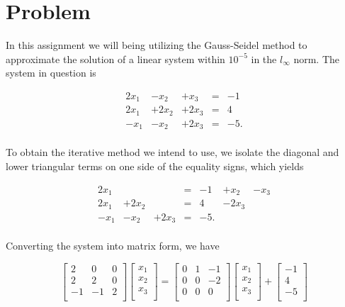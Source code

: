 \documentclass[a4paper, 12pt, twoside]{article}
\begin{document}
\section{Problem}
In this assignment we will being utilizing the Gauss-Seidel method to approximate the solution of a linear system within $10^{-5}$
in the $l_\infty$ norm. The system in question is 

\begin{equation}
\label{one}
\begin{array}{rrrrr}
2x_1& -x_2& + x_3& = & -1\\
2x_1& +2x_2& + 2x_3& = & 4\\
-x_1& -x_2& + 2x_3& = & -5.\\ 
\end{array}
\end{equation}

To obtain the iterative method we intend to use, we isolate the diagonal and lower triangular terms on one side of the equality signs, which yields

$$
\begin{array}{ccccccc}
2x_1& & & = & -1 & +x_2& - x_3\\
2x_1& +2x_2& & = & 4 & - 2x_3\\
-x_1& -x_2& + 2x_3& = & -5.\\ 
\end{array}
$$

Converting the system into matrix form, we have

\begin{equation}
\label{two}
\begin{bmatrix}
2&	0&	0\\
2&	2&	0\\
-1& -1& 2\\
\end{bmatrix}
\begin{bmatrix}
x_1\\x_2\\x_3\\
\end{bmatrix}
=
\begin{bmatrix}
0&	1&	-1\\
0&	0&	-2\\
0&	0&	0\\
\end{bmatrix}
\begin{bmatrix}
x_1\\x_2\\x_3\\
\end{bmatrix}
+
\begin{bmatrix}
-1\\4\\-5\\
\end{bmatrix}
\end{equation}
\end{document}

